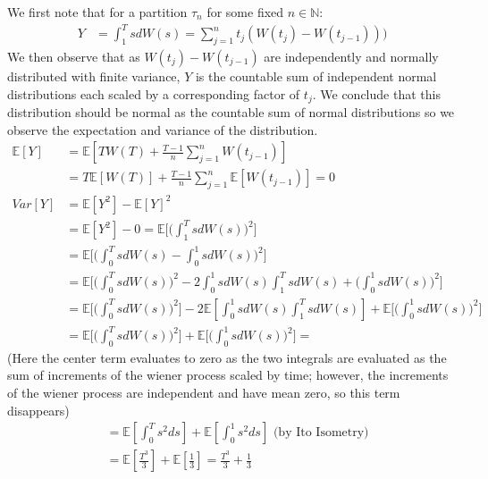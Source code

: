 \documentclass[12pt,twoside, letter]{exam}
\theoremstyle{definition}
\newcommand{\nn}{\mathbb{N}}
\newcommand{\ee}{\mathbb{E}}
\begin{document}
\begin{solution}
  We first note that for a partition $\tau_{n}$ for some fixed $n \in \nn$:
  \begin{align*}
    Y &= \int^{T}_{1} sdW(s) = \sum^n_{j=1} t_{j}(W(t_j) - W(t_{j-1})))
  \end{align*}
  We then observe that as $W(t_j)-W(t_{j-1})$ are independently and normally distributed with finite variance, $Y$ is the countable sum of
  independent normal distributions each scaled by a corresponding factor of $t_{j}$.
  We conclude that this distribution should be normal as the countable sum of normal distributions
  so we observe the expectation and variance of the distribution. \\
  \begin{align*}
    \ee[Y] &= \ee[TW(T) + \frac{T-1}{n} \sum^{n}_{j=1} W(t_{j-1})] \\
    &= T\ee[W(T)] + \frac{T-1}{n} \sum^{n}_{j=1} \ee[W(t_{j-1})] = 0 \\
    Var[Y] &= \ee[Y^2] - \ee[Y]^2 \\
    &= \ee[Y^2] - 0 = \ee \bigg[\big(\int^{T}_{1} sdW(s)\big)^2\bigg] \\
    &= \ee \bigg[\big(\int^{T}_{0} sdW(s) - \int^{1}_{0} sdW(s) \big)^2\bigg] \\
    &= \ee \bigg[\big(\int^{T}_{0} sdW(s) \big)^2 -2\int^{1}_{0}sdW(s)\int^{T}_{1}sdW(s) + \big(\int^{1}_{0} sdW(s) \big)^2\bigg] \\
    &= \ee \bigg[\big(\int^{T}_{0} sdW(s) \big)^2\bigg]
    - 2\ee [\int^{1}_{0}sdW(s)\int^{T}_{1}sdW(s)]
    + \ee \bigg[\big(\int^{1}_{0} sdW(s) \big)^2\bigg] \\
    &= \ee \bigg[\big(\int^{T}_{0} sdW(s) \big)^2\bigg]
    + \ee \bigg[\big(\int^{1}_{0} sdW(s) \big)^2\bigg] =
  \end{align*}
    (Here the center term evaluates to zero as the two integrals are evaluated as
    the sum of increments of the wiener process scaled by time; however, the increments of the wiener process are independent and have
    mean zero, so this term disappears) \\
  \begin{align*}
    &= \ee[\int^{T}_{0} s^2 ds] + \ee[\int^{1}_{0} s^2 ds]\text{ (by Ito Isometry)} \\
    &= \ee[\frac{T^{3}}{3}] + \ee[\frac{1}{3}] = \frac{T^{3}}{3} + \frac{1}{3}
  \end{align*}
\end{solution}
\end{document}
